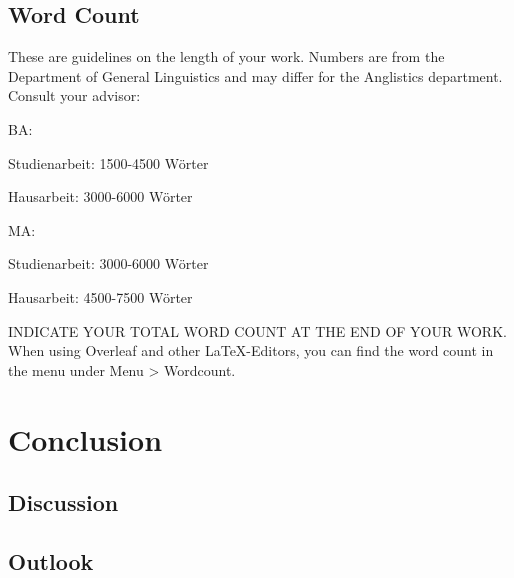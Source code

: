 \documentclass{article}
\begin{document}
\subsection{Word Count}

These are guidelines on the length of your work. Numbers are from the Department of General Linguistics and may differ for the Anglistics department. Consult your advisor:

\begin{compactitem}
\item BA: 
	\begin{compactitem}
		\item Studienarbeit: 1500-4500 Wörter
		\item Hausarbeit: 3000-6000 Wörter
	\end{compactitem}
\item MA:
	\begin{compactitem}
		\item Studienarbeit: 3000-6000 Wörter
		\item Hausarbeit: 4500-7500 Wörter
	\end{compactitem}

\end{compactitem}

INDICATE YOUR TOTAL WORD COUNT AT THE END OF YOUR WORK.
When using Overleaf and other \LaTeX-Editors, you can find the word count in the menu under Menu > Wordcount.

\section{Conclusion}
\subsection{Discussion}
\subsection{Outlook}



\newpage

\end{document}
